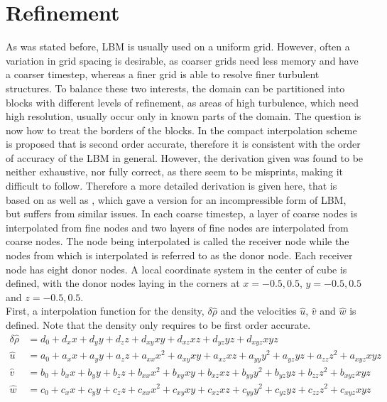 \section{Refinement}
As was stated before, LBM is usually used on a uniform grid. However, often a variation in grid spacing is desirable, as coarser grids need less memory and have a coarser timestep, whereas a finer grid is able to resolve finer turbulent structures. To balance these two interests, the domain can be partitioned into blocks with different levels of refinement, as areas of high turbulence, which need high resolution, usually occur only in known parts of the domain. The question is now how to treat the borders of the blocks. In \cite{schonherr_towards_2015} the compact interpolation scheme is proposed that is second order accurate, therefore it is consistent with the order of accuracy of the LBM in general. However, the derivation given was found to be neither exhaustive, nor fully correct, as there seem to be misprints, making it difficult to follow. Therefore a more detailed derivation is given here, that is based on \cite{schonherr_towards_2015} as well as \cite{kutscher_multiscale_2019}, which gave a version for an incompressible form of LBM, but suffers from similar issues. In each coarse timestep, a layer of coarse nodes is interpolated from fine nodes and two layers of fine nodes are interpolated from coarse nodes. The node being interpolated is called the receiver node while the nodes from which is interpolated is referred to as the donor node. Each receiver node has eight donor nodes. A local coordinate system in the center of cube is defined, with the donor nodes laying in the corners at $x={-0.5, 0.5}$, $y={-0.5,0.5}$ and $z={-0.5,0.5}$. \\First, a interpolation function for the density, $\delta \hat{\rho}$ and the velocities $\hat{u}$, $\hat{v}$ and $\hat{w}$ is defined. Note that the density only requires to be first order accurate.
\begin{align}
	 \delta \hat{\rho} &= d_0 + d_x x + d_y y + d_z z + d_{xy}xy + d_{xz}xz + d_{yz}yz + d_{xyz}xyz \\
	\hat{u} &= a_0 + a_x x + a_y y + a_z z + a_{xx} x^2 + a_{xy} xy + a_{xz} xz + a_{yy} y^2 + a_{yz} yz + a_{zz} z^2 + a_{xyz}xyz \\
	\hat{v} &= b_0 + b_x x + b_y y + b_z z + b_{xx} x^2 + b_{xy} xy + b_{xz} xz + b_{yy} y^2 + b_{yz} yz + b_{zz} z^2 + b_{xyz}xyz \\
	\hat{w} &= c_0 + c_x x + c_y y + c_z z + c_{xx} x^2 + c_{xy} xy + c_{xz} xz + c_{yy} y^2 + c_{yz} yz + c_{zz} z^2 + c_{xyz}xyz
\end{align}
